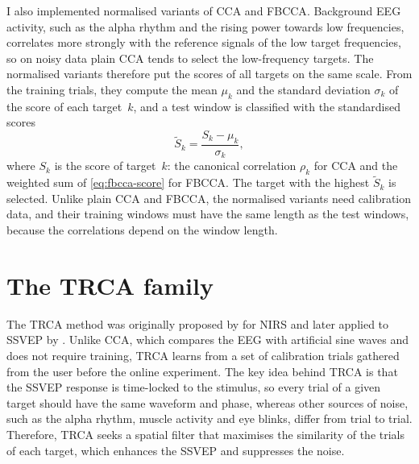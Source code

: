 I also implemented normalised variants of \ac{CCA} and \ac{FBCCA}. Background \ac{EEG}
activity, such as the alpha rhythm and the rising power towards low frequencies, correlates
more strongly with the reference signals of the low target frequencies, so on noisy data plain
\ac{CCA} tends to select the low-frequency targets. The normalised variants therefore put the
scores of all targets on the same scale. From the training trials, they compute the mean
$\mu_k$ and the standard deviation $\sigma_k$ of the score of each target~$k$, and a test
window is classified with the standardised scores
\begin{equation}
    \tilde{S}_k = \frac{S_k - \mu_k}{\sigma_k},
    \label{eq:normalised-score}
\end{equation}
where $S_k$ is the score of target~$k$: the canonical correlation $\rho_k$ for \ac{CCA} and the
weighted sum of \cref{eq:fbcca-score} for \ac{FBCCA}. The target with the highest
$\tilde{S}_k$ is selected. Unlike plain \ac{CCA} and \ac{FBCCA}, the normalised variants
need calibration data, and their training windows must have the same length as the test
windows, because the correlations depend on the window length.

\section{The TRCA family}
\label{sec:trca}

The \ac{TRCA} method was originally proposed by \citet{tanaka2013trca} for \ac{NIRS}
and later applied to \ac{SSVEP} by \citet{nakanishi2018trca}. Unlike \ac{CCA}, which compares
the \ac{EEG} with artificial sine waves and does not require training, \ac{TRCA} learns
from a set of calibration trials gathered from the user before the online experiment.
The key idea behind \ac{TRCA} is that the \ac{SSVEP} response is time-locked to the stimulus,
so every trial of a given target should have the same waveform and phase, whereas other
sources of noise, such as the alpha rhythm, muscle activity and eye blinks, differ from trial
to trial. Therefore, \ac{TRCA} seeks a spatial filter that maximises the similarity of the
trials of each target, which enhances the \ac{SSVEP} and suppresses the noise.


